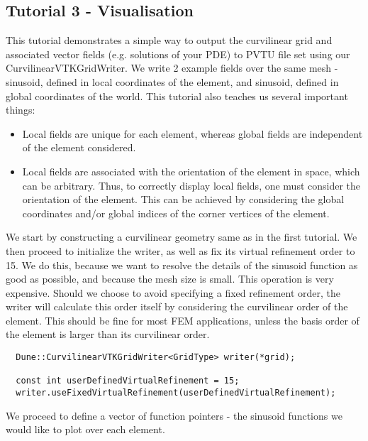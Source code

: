 \subsection{Tutorial 3 - Visualisation}
\label{usage-howto-tutorial-visualisation}

This tutorial demonstrates a simple way to output the curvilinear grid and associated vector fields (e.g. solutions of your PDE) to PVTU file set using our CurvilinearVTKGridWriter. We write 2 example fields over the same mesh - sinusoid, defined in local coordinates of the element, and sinusoid, defined in global coordinates of the world. This tutorial also teaches us several important things:
\begin{itemize}
	\item Local fields are unique for each element, whereas global fields are independent of the element considered.
	\item Local fields are associated with the orientation of the element in space, which can be arbitrary. Thus, to correctly display local fields, one must consider the orientation of the element. This can be achieved by considering the global coordinates and/or global indices of the corner vertices of the element.
\end{itemize}

\noindent
We start by constructing a curvilinear geometry same as in the first tutorial. We then proceed to initialize the writer, as well as fix its virtual refinement order to 15. We do this, because we want to resolve the details of the sinusoid function as good as possible, and because the mesh size is small. This operation is very expensive. Should we choose to avoid specifying a fixed refinement order, the writer will calculate this order itself by considering the curvilinear order of the element. This should be fine for most FEM applications, unless the basis order of the element is larger than its curvilinear order. \\

\begin{mybox}
\begin{lstlisting}    
  Dune::CurvilinearVTKGridWriter<GridType> writer(*grid);
    
  const int userDefinedVirtualRefinement = 15;
  writer.useFixedVirtualRefinement(userDefinedVirtualRefinement);
\end{lstlisting}
\end{mybox}

\noindent
We proceed to define a vector of function pointers - the sinusoid functions we would like to plot over each element. \\

